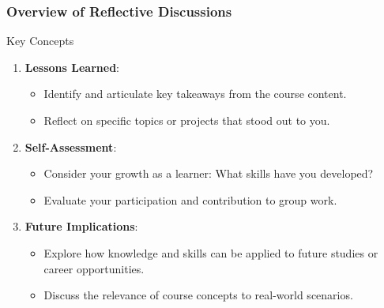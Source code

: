 \documentclass[aspectratio=169]{beamer}
\begin{document}
\begin{frame}[fragile]
    \frametitle{Overview of Reflective Discussions}
    \begin{block}{Key Concepts}
        \begin{enumerate}
            \item \textbf{Lessons Learned}:
                \begin{itemize}
                    \item Identify and articulate key takeaways from the course content.
                    \item Reflect on specific topics or projects that stood out to you.
                \end{itemize}
                
            \item \textbf{Self-Assessment}:
                \begin{itemize}
                    \item Consider your growth as a learner: What skills have you developed?
                    \item Evaluate your participation and contribution to group work.
                \end{itemize}
                
            \item \textbf{Future Implications}:
                \begin{itemize}
                    \item Explore how knowledge and skills can be applied to future studies or career opportunities.
                    \item Discuss the relevance of course concepts to real-world scenarios.
                \end{itemize}
        \end{enumerate}
    \end{block}
\end{frame}
\end{document}
